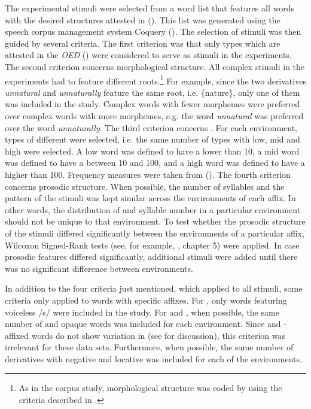 The experimental stimuli were selected from a word list that features all words with the desired structures attested in  (\citealt{Davies.20082014}). This list was generated using the speech corpus management system Coquery (\citealt{Kunter.2016}). The selection of stimuli was then guided by several criteria. 
The first criterion was that only types which are attested in the \textit{OED} (\citealt{OED.2013}) were considered to serve as stimuli in the experiments. 
The second criterion concerns morphological structure. All complex stimuli in the experiments had to feature different roots.\footnote{As in the corpus study, morphological structure was coded by using the criteria described in .} For example, since the two derivatives \textit{unnatural} and \textit{unnaturally} feature the same root, i.e. \{nature\}, only one of them was included in the study. Complex words with fewer morphemes were preferred over complex words with more morphemes, e.g. the word \textit{unnatural} was preferred over the word \textit{unnaturally}. 
 The third criterion concerns . For each environment, types of different  were selected, i.e. the same number of types with low, mid and high  were selected. A low  word was defined to have a  lower than 10, a mid  word was defined to have a  between 10 and 100, and a high  word was defined to have a  higher than 100. Frequency measures were taken from  (\citealt{Davies.20082014}).
  The fourth criterion concerns prosodic structure. When possible, the number of syllables and the  pattern of the stimuli was kept similar across the environments of each affix. In other words, the distribution of  and syllable number in a particular environment should not be unique to that environment. To test whether the prosodic structure of the stimuli differed significantly between the environments of a particular affix, Wilcoxon Signed-Rank tests (see, for example, \citealt{Crawley.2012}, chapter 5) were applied. In case prosodic features differed significantly, additional stimuli were added until there was no significant difference between environments.
 
 In addition to the four criteria just mentioned, which applied to all stimuli, some criteria only applied to words with specific affixes. 
 For , only words featuring voiceless /s/ were included in the study. 
  For  and , when possible, the same number of  and opaque words was included for each environment. Since  and -affixed words do not show variation in  (see  for discussion), this criterion was irrelevant for these data sets.
 Furthermore, when possible, the same number of derivatives with negative and locative  was included for each of the environments. 
 
